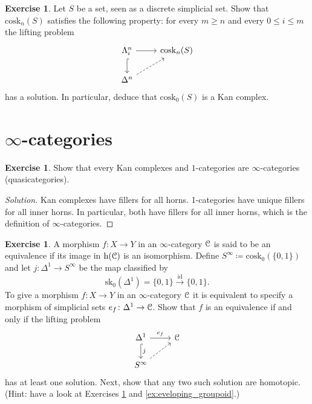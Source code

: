 \documentclass[10pt,a4paper,reqno,oneside]{book} %
\theoremstyle{plain}
\theoremstyle{definition}
\newtheorem{exercise}[thm]{Exercise}
\theoremstyle{remark}
\numberwithin{equation}{section}
\begin{document}
\begin{exercise} \label{ex:coskeleton_Kan_complex}
	Let $S$ be a set, seen as a discrete simplicial set.
	Show that $\mathrm{cosk}_n(S)$ satisfies the following property: for every $m \ge n$ and every $0 \le i \le m$ the lifting problem
	\[ \begin{tikzcd}
		\Lambda^n_i \arrow{r} \arrow[hook]{d} & \mathrm{cosk}_n(S) \\
		\Delta^n \arrow[dashed]{ur}
	\end{tikzcd} \]
	has a solution.
	In particular, deduce that $\mathrm{cosk}_0(S)$ is a Kan complex.
\end{exercise}

\section{$\infty$-categories}

\begin{exercise}
	Show that every Kan complexes and $1$-categories are $\infty$-categories (quasicategories).
\end{exercise}

\ifpersonal
\begin{proof}[Solution]
Kan complexes have fillers for all horns. 1-categories have unique fillers for all inner horns. In particular, both have
fillers for all inner horns, which is the definition of $\infty$-categories.
\end{proof}
\fi

\begin{exercise} \label{ex:equivalences_S_infty}
	A morphism $f \colon X \to Y$ in an $\infty$-category $\mathcal C$ is said to be an equivalence if its image in $\mathrm h(\mathcal C)$ is an isomorphism.
	Define $S^\infty \coloneqq \mathrm{cosk}_0(\{0,1\})$ and let $j \colon \Delta^1 \to S^\infty$ be the map classified by
	\[ \mathrm{sk}_0(\Delta^1) = \{0,1\} \xrightarrow{\mathrm{id}} \{0,1\} . \]
	To give a morphism $f \colon X \to Y$ in an $\infty$-category $\mathcal C$ it is equivalent to specify a morphism of simplicial sets $e_f \colon \Delta^1 \to \mathcal C$.
	Show that $f$ is an equivalence if and only if the lifting problem
	\[ \begin{tikzcd}
		\Delta^1 \arrow[hook]{d}{j} \arrow{r}{e_f} & \cC \\
		S^\infty \arrow[dashed]{ur}
	\end{tikzcd} \]
	has at least one solution.
	Next, show that any two such solution are homotopic.
	(Hint: have a look at Exercises \ref{ex:coskeleton_Kan_complex} and \ref{ex:eveloping_groupoid}.)
\end{exercise}
\end{document}
